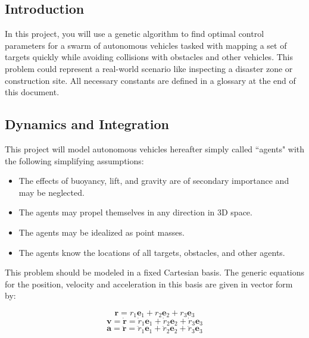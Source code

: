 \documentclass{article}
\begin{document}
\pagestyle{mypagestyle}






\subsection*{Introduction}
In this project, you will use a genetic algorithm to find optimal control parameters for a swarm of autonomous vehicles tasked with mapping a set of targets quickly while avoiding collisions with obstacles and other vehicles. This problem could represent a real-world scenario like inspecting a disaster zone or construction site. All necessary constants are defined in a glossary at the end of this document.   



\subsection*{Dynamics and Integration}


This project will model autonomous vehicles hereafter simply called ``agents" with the following simplifying assumptions: 
\begin{itemize}
    \item The effects of buoyancy, lift, and gravity are of secondary importance and may be neglected. 
    \item The agents may propel themselves in any direction in 3D space. 
    \item The agents may be idealized as point masses. 
    \item The agents know the locations of all targets, obstacles, and other agents.
\end{itemize}

This problem should be modeled in a fixed Cartesian basis. The generic equations for the position, velocity and acceleration in this basis are given in vector form by: 

\begin{equation}
    \boldsymbol{r} = r_1\boldsymbol{e}_1 + r_2\boldsymbol{e}_2 + r_3\boldsymbol{e}_3 \label{pos}
\end{equation}
\begin{equation}
    \boldsymbol{v} = \boldsymbol{\dot{r}} = \dot{r}_1\boldsymbol{e}_1 + \dot{r}_2\boldsymbol{e}_2 + \dot{r}_3\boldsymbol{e}_3 \label{vel}
\end{equation}
\begin{equation}
    \boldsymbol{a} = \boldsymbol{\ddot{r}} = \ddot{r}_1\boldsymbol{e}_1 + \ddot{r}_2\boldsymbol{e}_2 + \ddot{r}_3\boldsymbol{e}_3 \label{accel}
\end{equation}
\end{document}
